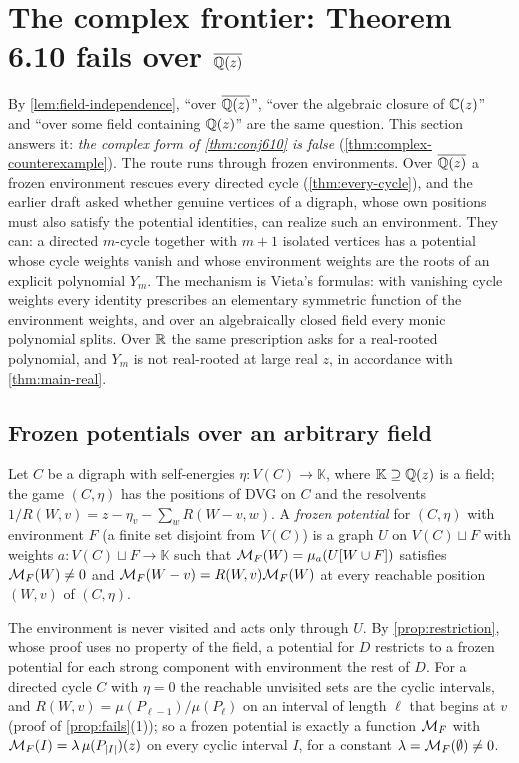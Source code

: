 \section{The complex frontier: Theorem 6.10 fails over \texorpdfstring{$\overline{\mathbb{Q}(z)}$}{the algebraic closure}}\label{sec:complex}

By \cref{lem:field-independence}, ``over $\overline{\mathbb{Q}(z)}$'', ``over the algebraic closure of $\mathbb{C}(z)$'' and ``over some field containing $\mathbb{Q}(z)$'' are the same question. This section answers it: \emph{the complex form of \cref{thm:conj610} is false} (\cref{thm:complex-counterexample}). The route runs through frozen environments. Over $\overline{\mathbb{Q}(z)}$ a frozen environment rescues every directed cycle (\cref{thm:every-cycle}), and the earlier draft asked whether genuine vertices of a digraph, whose own positions must also satisfy the potential identities, can realize such an environment. They can: a directed $m$-cycle together with $m+1$ isolated vertices has a potential whose cycle weights vanish and whose environment weights are the roots of an explicit polynomial $Y_m$. The mechanism is Vieta's formulas: with vanishing cycle weights every identity prescribes an elementary symmetric function of the environment weights, and over an algebraically closed field every monic polynomial splits. Over $\mathbb{R}$ the same prescription asks for a real-rooted polynomial, and $Y_m$ is not real-rooted at large real $z$, in accordance with \cref{thm:main-real}.

\subsection{Frozen potentials over an arbitrary field}

\begin{definition}\label{def:frozen}
Let $C$ be a digraph with self-energies $\eta\colon V(C)\to\mathbb K$, where $\mathbb K\supseteq\mathbb{Q}(z)$ is a field; the game $(C,\eta)$ has the positions of DVG on $C$ and the resolvents $1/R(W,v)=z-\eta_v-\sum_{w}R(W-v,w)$. A \emph{frozen potential} for $(C,\eta)$ with environment $F$ (a finite set disjoint from $V(C)$) is a graph $U$ on $V(C)\sqcup F$ with weights $a\colon V(C)\sqcup F\to\mathbb K$ such that $\mathcal{M}_F(W)=\mu_a(U[W\cup F])$ satisfies $\mathcal{M}_F(W)\neq0$ and $\mathcal{M}_F(W-v)=R(W,v)\mathcal{M}_F(W)$ at every reachable position $(W,v)$ of $(C,\eta)$.
\end{definition}

The environment is never visited and acts only through $U$. By \cref{prop:restriction}, whose proof uses no property of the field, a potential for $D$ restricts to a frozen potential for each strong component with environment the rest of $D$. For a directed cycle $C$ with $\eta=0$ the reachable unvisited sets are the cyclic intervals, and $R(W,v)=\mu(P_{\ell-1})/\mu(P_\ell)$ on an interval of length $\ell$ that begins at $v$ (proof of \cref{prop:fails}(1)); so a frozen potential is exactly a function $\mathcal{M}_F$ with $\mathcal{M}_F(I)=\lambda\,\mu(P_{|I|})(z)$ on every cyclic interval $I$, for a constant $\lambda=\mathcal{M}_F(\emptyset)\neq0$.

